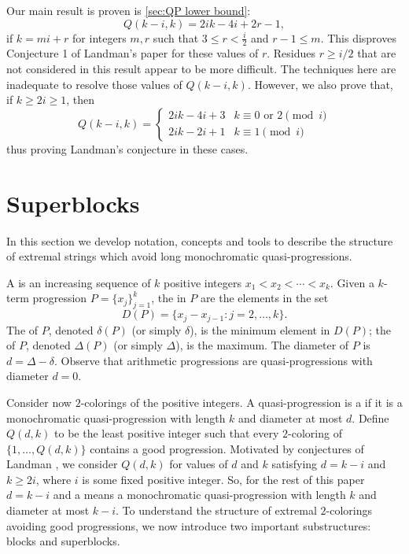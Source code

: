 Our main result is proven is \autoref{sec:QP lower bound}: \[ Q(k-i,k) = 2ik-4i+2r-1,\] if $k=mi+r$ for integers $m,r$ such that $3 \leq r < \frac{i}{2}$ and $r-1 \leq m$. This disproves Conjecture 1 of Landman's paper for these values of $r$. Residues $r\geq i/2$ that are not considered in this result appear to be more difficult. The techniques here are inadequate to resolve those values of $Q(k-i,k)$. However, we also prove that, if $k\geq 2i \geq 1$, then 
\[ Q\left(k-i,k\right) =
	\begin{cases}
		2ik-4i+3	&k \equiv 0\text{ or }2 \pmod{i}\\
		2ik-2i+1	&k \equiv 1 \pmod{i}
	\end{cases}
\] thus proving Landman's conjecture in these cases.

\section{Superblocks\label{sec:superblocks}}

In this section we develop notation, concepts and tools to describe the structure of extremal strings which avoid long monochromatic quasi-progressions.

A  is an increasing sequence of $k$ positive integers $x_1 < x_2 < \cdots < x_k$. Given a $k$-term progression $P=\{x_j\}_{j=1}^k$, the  in $P$ are the elements in the set  \[ D(P) = \{ x_j - x_{j-1} : j=2,\ldots,k\}.\] The  of $P$, denoted $\delta(P)$ (or simply $\delta$), is the minimum element in $D(P)$;  the  of $P$, denoted $\Delta(P)$ (or simply $\Delta$), is the maximum. The diameter of $P$ is $d = \Delta - \delta$. Observe that arithmetic progressions are quasi-progressions with diameter $d = 0$.

Consider now $2$-colorings of the positive integers. A quasi-progression is a  if it is a monochromatic quasi-progression with length $k$ and diameter at most $d$. Define $Q(d,k)$ to be the least positive integer such that every $2$-coloring of $\{1,\ldots,Q(d,k)\}$ contains a good progression. Motivated by conjectures of Landman \cite{L}, we consider $Q(d,k)$ for values of $d$ and $k$ satisfying $d = k - i$ and $k \geq 2i$, where $i$ is some fixed positive integer. So, for the rest of this paper $d = k-i$ and a  means a monochromatic quasi-progression with length $k$ and diameter at most $k-i$. To understand the structure of extremal $2$-colorings avoiding good progressions, we now introduce two important substructures: blocks and superblocks.

